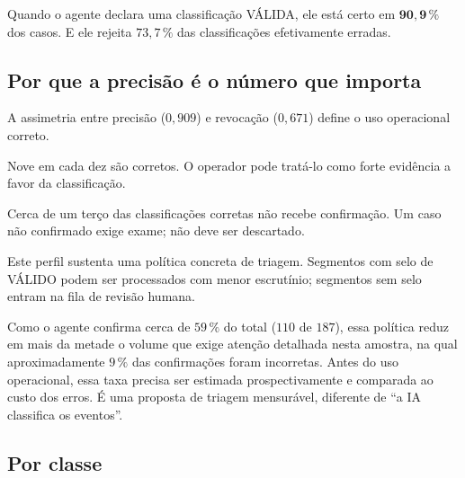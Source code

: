 \begin{resultadochave}
Quando o agente declara uma classificação VÁLIDA, ele está certo em $\bm{90{,}9\,\%}$ dos
casos. E ele rejeita $73{,}7\,\%$ das classificações efetivamente erradas.
\end{resultadochave}

\subsection{Por que a precisão é o número que importa}

A assimetria entre precisão ($0{,}909$) e revocação ($0{,}671$) define o uso operacional
correto.

\begin{description}[leftmargin=0pt,style=nextline,itemsep=0.4em]

\item[Um selo de VÁLIDO é confiável.] Nove em cada dez são corretos. O operador pode
tratá-lo como forte evidência a favor da classificação.

\item[A ausência do selo não é evidência contra.] Cerca de um terço das classificações
corretas não recebe confirmação. Um caso não confirmado exige exame; não deve ser
descartado.

\end{description}

\begin{destaque}
Este perfil sustenta uma política concreta de triagem. Segmentos com selo de VÁLIDO
podem ser processados com menor escrutínio; segmentos sem selo entram na fila de revisão
humana.

Como o agente confirma cerca de $59\,\%$ do total ($110$ de $187$), essa política reduz
em mais da metade o volume que exige atenção detalhada nesta amostra, na qual
aproximadamente $9\,\%$ das confirmações foram incorretas. Antes do uso operacional,
essa taxa precisa ser estimada prospectivamente e comparada ao custo dos erros. É uma
proposta de triagem mensurável, diferente de ``a IA classifica os eventos''.
\end{destaque}

\subsection{Por classe}

